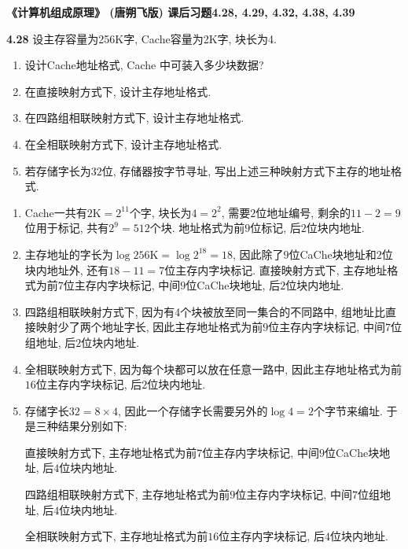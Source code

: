 \documentclass[UTF8]{report}
\newcommand{\mrm}[1]{\mathrm{#1}}
\newcommand{\problem}[1]{{\setlength{\parskip}{10pt}\noindent \bf{#1}}}
\newenvironment{solution}{{\noindent\hskip 2em \bf 解 \quad}}{}
\begin{document}

\maketitle



\textbf{《计算机组成原理》 (唐朔飞版) 课后习题4.28, 4.29, 4.32, 4.38, 4.39}

\problem{4.28} 设主存容量为256K字, Cache容量为2K字, 块长为4.
\begin{enumerate}[label=(\arabic*)]
    \item 设计Cache地址格式,  Cache 中可装入多少块数据? 
    \item 在直接映射方式下, 设计主存地址格式. 
    \item 在四路组相联映射方式下, 设计主存地址格式. 
    \item 在全相联映射方式下, 设计主存地址格式. 
    \item 若存储字长为$32$位, 存储器按字节寻址, 写出上述三种映射方式下主存的地址格式. 
\end{enumerate}

\begin{solution}
    \begin{enumerate}[label=(\arabic*)]
        \item Cache一共有$2\mrm{K} = 2^{11}$个字, 块长为$4 = 2^2$, 需要$2$位地址编号, 剩余的$11-2=9$位用于标记, 共有$2^9 = 512$个块. 地址格式为前$9$位标记, 后$2$位块内地址.
        \item 主存地址的字长为$\log{256\mrm{K}} = \log{2^{18}} = 18$, 因此除了$9$位CaChe块地址和$2$位块内地址外, 还有$18-11=7$位主存内字块标记. 直接映射方式下, 主存地址格式为前$7$位主存内字块标记, 中间$9$位CaChe块地址, 后$2$位块内地址.
        \item 四路组相联映射方式下, 因为有4个块被放至同一集合的不同路中, 组地址比直接映射少了两个地址字长, 因此主存地址格式为前$9$位主存内字块标记, 中间$7$位组地址, 后$2$位块内地址.
        \item 全相联映射方式下, 因为每个块都可以放在任意一路中, 因此主存地址格式为前$16$位主存内字块标记, 后$2$位块内地址.
        \item 存储字长$32 = 8 \times 4$, 因此一个存储字长需要另外的$\log{4} = 2$个字节来编址. 于是三种结果分别如下:
        
        直接映射方式下, 主存地址格式为前$7$位主存内字块标记, 中间$9$位CaChe块地址, 后$4$位块内地址.

        四路组相联映射方式下, 主存地址格式为前$9$位主存内字块标记, 中间$7$位组地址, 后$4$位块内地址.

        全相联映射方式下, 主存地址格式为前$16$位主存内字块标记, 后$4$位块内地址.
    \end{enumerate}
\end{solution}
    
\end{document}
